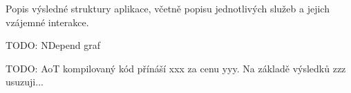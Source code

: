 


Popis výsledné struktury aplikace, včetně popisu jednotlivých služeb a jejich vzájemné interakce.

TODO: NDepend graf





TODO: AoT kompilovaný kód přínáší xxx za cenu yyy. Na základě výsledků zzz usuzuji...
